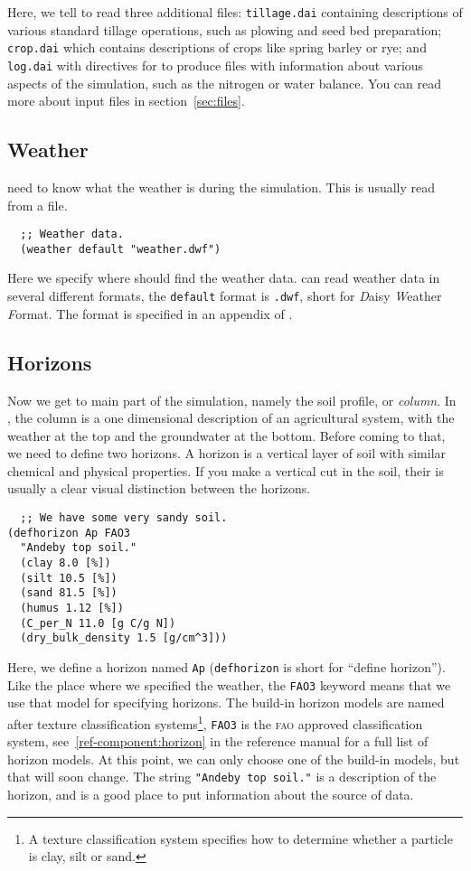 \documentclass[a4paper,11pt]{article}
\begin{document}
Here, we tell \daisy{} to read three additional files:
\texttt{tillage.dai} containing descriptions of various standard
tillage operations, such as plowing and seed bed preparation;
\texttt{crop.dai} which contains descriptions of crops like spring
barley or rye; and \texttt{log.dai} with directives for \daisy{} to
produce files with information about various aspects of the
simulation, such as the nitrogen or water balance.  You can read more
about input files in section~\ref{sec:files}.

\subsection{Weather}

\Daisy{} need to know what the weather is during the simulation.  This
is usually read from a file.

\begin{verbatim}
  ;; Weather data.
  (weather default "weather.dwf")
\end{verbatim}

Here we specify where \daisy{} should find the weather data.  \Daisy{}
can read weather data in several different formats, the
\texttt{default} format is \texttt{.dwf}, short for \emph{D}aisy
\emph{W}eather \emph{F}ormat.  The format is specified in an appendix
 of \cite{dina81}.

\subsection{Horizons}
\label{sec:ex-hor}

Now we get to main part of the simulation, namely the soil profile, or
\emph{column}.  In \daisy{}, the column is a one dimensional
description of an agricultural system, with the weather at the top and
the groundwater at the bottom.  Before coming to that, we need to
define two horizons.  A horizon is a vertical layer of soil with
similar chemical and physical properties.  If you make a vertical cut
in the soil, their is usually a clear visual distinction between the
horizons.

\begin{verbatim}
  ;; We have some very sandy soil.
(defhorizon Ap FAO3
  "Andeby top soil."
  (clay 8.0 [%])
  (silt 10.5 [%])
  (sand 81.5 [%])
  (humus 1.12 [%])
  (C_per_N 11.0 [g C/g N])
  (dry_bulk_density 1.5 [g/cm^3]))
\end{verbatim}

Here, we define a horizon named \texttt{Ap} (\texttt{defhorizon} is
short for ``define horizon'').  Like the place where we specified the
weather, the \texttt{FAO3} keyword means that we use that model for
specifying horizons.  The build-in horizon models are named after
texture classification systems\footnote{A texture classification
  system specifies how to determine whether a particle is clay, silt
  or sand.}, \texttt{FAO3} is the \textsc{fao} approved classification
system, see~\ref{ref-component:horizon} in the reference manual for a
full list of horizon models. At this point, we can only choose one of
the build-in models, but that will soon change.  The string
\texttt{"Andeby top soil."} is a description of the horizon, and is a
good place to put information about the source of data.
\end{document}
